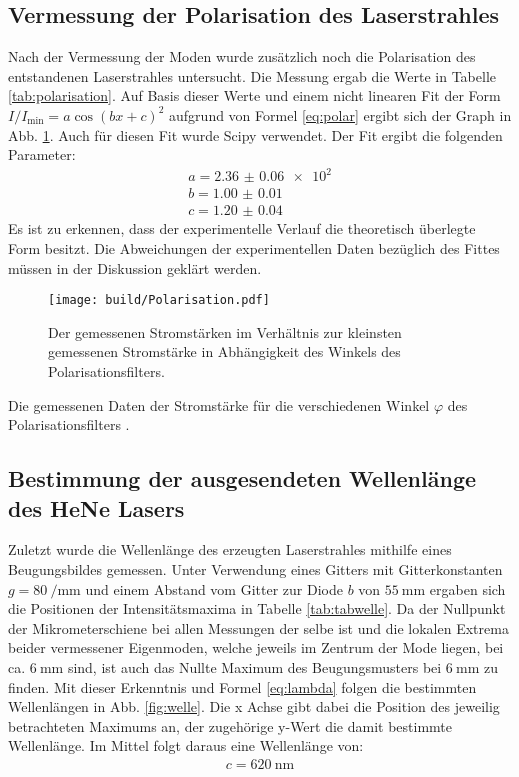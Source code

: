 \subsection{Vermessung der Polarisation des Laserstrahles}
Nach der Vermessung der Moden wurde zusätzlich noch die Polarisation des entstandenen Laserstrahles untersucht. Die Messung ergab die Werte in Tabelle \ref{tab:polarisation}. Auf Basis dieser Werte und einem nicht linearen Fit der Form $I/I_\text{min} = a  \cos(b x + c)^2$
 aufgrund von Formel \eqref{eq:polar} ergibt sich der Graph in Abb. \ref{fig:polarisation}. Auch für diesen Fit wurde Scipy \cite{scipy} verwendet. Der Fit ergibt die folgenden Parameter:
 \begin{gather*}
	a = \num{2.36(6)e2}\\
	b = \num{1.00(1)}\\
	c = \num{1.20(4)}
	\end{gather*}
Es ist zu erkennen, dass der experimentelle Verlauf die theoretisch überlegte Form besitzt. Die Abweichungen der experimentellen Daten bezüglich des Fittes müssen in der Diskussion geklärt werden.
\begin{figure}
	\centering
	\texttt{[image: build/Polarisation.pdf]}
	\caption{Der gemessenen Stromstärken im Verhältnis zur kleinsten gemessenen Stromstärke in Abhängigkeit des Winkels des Polarisationsfilters.}
	\label{fig:polarisation}
\end{figure}


\begin{table}
	\centering
	\caption{Die gemessenen Daten der Stromstärke für die verschiedenen Winkel $\varphi$ des Polarisationsfilters .}
	
	\label{tab:polarisation}
\end{table}


\subsection{Bestimmung der ausgesendeten Wellenlänge des HeNe Lasers}
Zuletzt wurde die Wellenlänge des erzeugten Laserstrahles mithilfe eines Beugungsbildes gemessen. Unter Verwendung eines Gitters mit Gitterkonstanten $g = \SI{80}{\per\milli\meter}$ und einem Abstand vom Gitter zur Diode $b$ von $\SI{55}{\milli\meter}$ ergaben sich die Positionen der Intensitätsmaxima in Tabelle \ref{tab:tabwelle}. Da der Nullpunkt der Mikrometerschiene bei allen Messungen der selbe ist und die lokalen Extrema beider vermessener Eigenmoden, welche jeweils im Zentrum der Mode liegen, bei ca. $\SI{6}{\milli\meter}$ sind, ist auch das Nullte Maximum des Beugungsmusters bei $\SI{6}{\milli\meter}$ zu finden. Mit dieser Erkenntnis und Formel \eqref{eq:lambda} folgen die bestimmten Wellenlängen in Abb. \ref{fig:welle}. Die x Achse gibt dabei die Position des jeweilig betrachteten Maximums an, der zugehörige y-Wert die damit bestimmte Wellenlänge. Im Mittel folgt daraus eine Wellenlänge von: 
\begin{gather*}
	c = \SI{620}{\nano\meter}
	\end{gather*}


